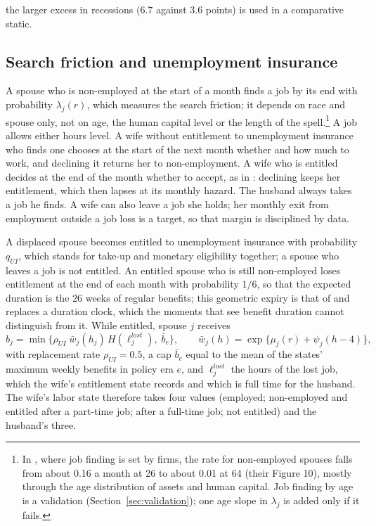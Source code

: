the larger excess in recessions (6.7 against 3.6 points) is used in a comparative static.

\subsection{Search friction and unemployment insurance}

A spouse who is non-employed at the start of a month finds a job by its end with probability $\lambda_j(r)$, which
measures the search friction; it depends on race and spouse only, not on age, the human capital level or the length
of the spell.\footnote{In \citet{bacher2025joint}, where job finding is set by firms, the rate for non-employed spouses
falls from about 0.16 a month at 26 to about 0.01 at 64 (their Figure 10), mostly through the age distribution of
assets and human capital. Job finding by age is a validation (Section~\ref{sec:validation}); one age slope in
$\lambda_j$ is added only if it fails.} A job allows either hours level. A wife without entitlement to unemployment
insurance who finds one chooses at the start of the next month whether and how much to work, and declining it returns
her to non-employment. A wife who is entitled decides at the end of the month whether to accept, as in
\citet{bacher2025joint}: declining keeps her entitlement, which then lapses at its monthly hazard. The husband always
takes a job he finds. A wife can also leave a job she holds; her monthly exit from employment outside a job loss is a
target, so that margin is disciplined by data.

A displaced spouse becomes entitled to unemployment insurance with probability $q_{UI}$, which stands for take-up and
monetary eligibility together; a spouse who leaves a job is not entitled. An entitled spouse who is still non-employed
loses entitlement at the end of each month with probability $1/6$, so that the expected duration is the 26 weeks of
regular benefits; this geometric expiry is that of \citet{bacher2025joint} and replaces a duration clock, which the
moments that see benefit duration cannot distinguish from it. While entitled, spouse $j$ receives
\[
  b_j = \min\big\{\rho_{UI}\; \bar w_j(h_j)\, H(\ell_j^{lost}),\; \bar b_{e}\big\},
  \qquad \bar w_j(h) = \exp\{\mu_j(r) + \psi_j(h - 4)\},
\]
with replacement rate $\rho_{UI} = 0.5$, a cap $\bar b_e$ equal to the mean of the states' maximum weekly benefits in
policy era $e$, and $\ell_j^{lost}$ the hours of the lost job, which the wife's entitlement state records and which is
full time for the husband. The wife's labor state therefore takes four values (employed; non-employed and entitled
after a part-time job; after a full-time job; not entitled) and the husband's three.

